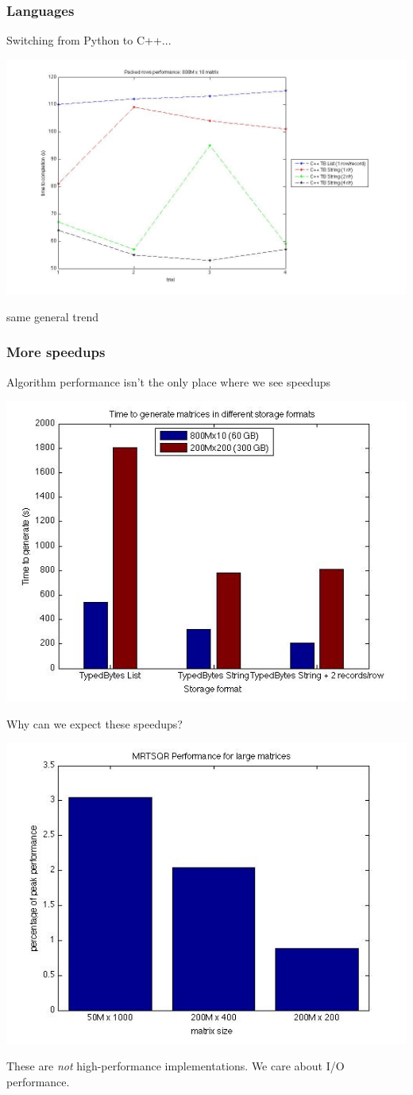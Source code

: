 \documentclass{beamer}
\begin{document}
\begin{frame}
\frametitle{Languages}

Switching from Python to C++...

\begin{center}
\includegraphics[height=2.in]{./images/cpp_perf.jpg}
\end{center}

same general trend

\end{frame}

\begin{frame}
\frametitle{More speedups}

Algorithm performance isn't the only place where we see speedups

\begin{center}
\includegraphics[height=2.in]{./images/gen_times.jpg}
\end{center}

\end{frame}


\begin{frame}

Why can we expect these speedups?

\begin{center}
\includegraphics[height=2.in]{./images/peak_perf.jpg}
\end{center}

These are \emph{not} high-performance implementations.  We care about I/O performance.

\end{frame}
\end{document}
